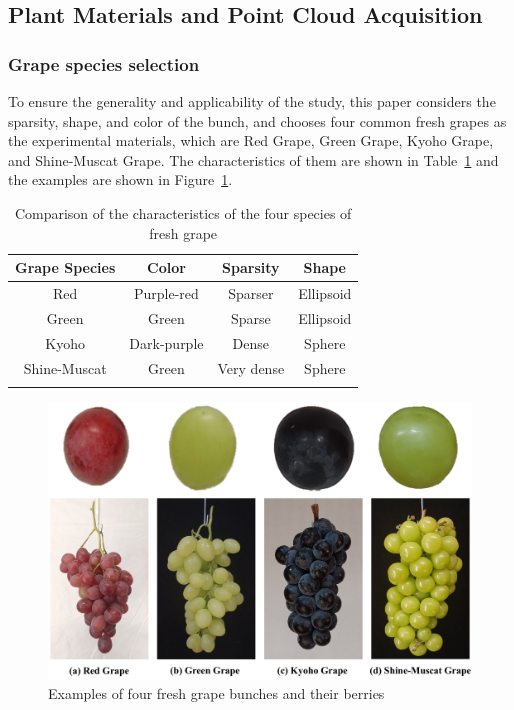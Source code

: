 \documentclass[12pt]{article}
\begin{document}
\subsection{Plant Materials and Point Cloud Acquisition}

\subsubsection{Grape species selection}

To ensure the generality and applicability of the study, this paper considers the sparsity, shape, and color of the bunch, and chooses four common fresh grapes as the experimental materials, which are Red Grape, Green Grape, Kyoho Grape, and Shine-Muscat Grape. 
The characteristics of them are shown in Table~\ref{tbl:1} and the examples are shown in Figure~\ref{fig:raw86}.

\begin{table}[h]
    \centering
    \caption{Comparison of the characteristics of the four species of fresh grape}
    \begin{tabular}{cccc}
        \hline
        \textbf{Grape Species} & \textbf{Color} & \textbf{Sparsity} & \textbf{Shape} \\
        \hline
        Red & Purple-red & Sparser & Ellipsoid \\
        Green & Green & Sparse & Ellipsoid \\
        Kyoho & Dark-purple & Dense & Sphere \\
        Shine-Muscat & Green & Very dense & Sphere \\
        \hline
    \label{tbl:1}
    \end{tabular}
\end{table}

\begin{figure}[hbt!]
    \centering
    \includegraphics[width=1\textwidth]{figures/Figure2.pdf}
    \caption{Examples of four fresh grape bunches and their berries}
    \label{fig:raw86}
\end{figure}
\end{document}
